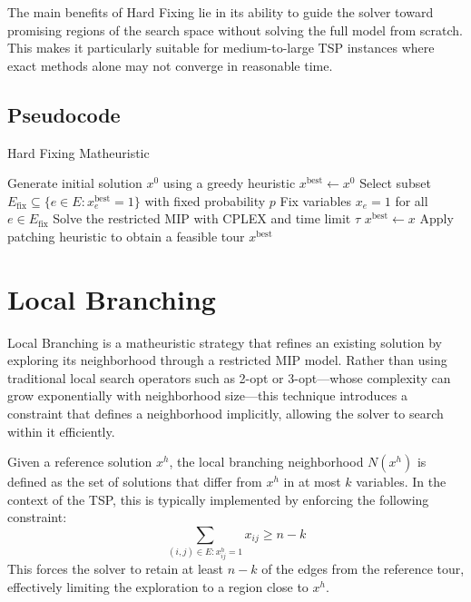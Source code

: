 The main benefits of Hard Fixing lie in its ability to guide the solver toward promising regions of the search space without solving the full model from scratch. This makes it particularly suitable for medium-to-large TSP instances where exact methods alone may not converge in reasonable time.

\subsection{Pseudocode}

\begin{algorithm}[H]
\caption{Hard Fixing Matheuristic}
\begin{algorithmic}[1]
\State Generate initial solution $x^0$ using a greedy heuristic
\State $x^\text{best} \gets x^0$
\Repeat
    \State Select subset $E_\text{fix} \subseteq \{e \in E : x^\text{best}_e = 1\}$ with fixed probability $p$
    \State Fix variables $x_e = 1$ for all $e \in E_\text{fix}$
    \State Solve the restricted MIP with CPLEX and time limit $\tau$
        \State $x^\text{best} \gets x$
        \State Apply patching heuristic to obtain a feasible tour
    \EndIf
{}
\State \Return $x^\text{best}$
\end{algorithmic}
\end{algorithm}

\section{Local Branching}

Local Branching is a matheuristic strategy that refines an existing solution by exploring its neighborhood through a restricted MIP model. Rather than using traditional local search operators such as 2-opt or 3-opt—whose complexity can grow exponentially with neighborhood size—this technique introduces a constraint that defines a neighborhood implicitly, allowing the solver to search within it efficiently.

Given a reference solution \( x^h \), the local branching neighborhood \( N(x^h) \) is defined as the set of solutions that differ from \( x^h \) in at most \( k \) variables. In the context of the TSP, this is typically implemented by enforcing the following constraint:
\[
\sum_{(i,j) \in E : x^h_{ij} = 1} x_{ij} \geq n - k
\]
This forces the solver to retain at least \( n - k \) of the edges from the reference tour, effectively limiting the exploration to a region close to \( x^h \).

